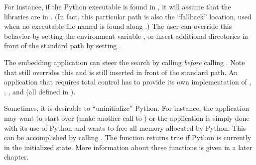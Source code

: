 For instance, if the Python executable is found in
, it will assume that the libraries are in
.  (In fact, this particular path
is also the ``fallback'' location, used when no executable file named
 is found along .)  The user can override
this behavior by setting the environment variable ,
or insert additional directories in front of the standard path by
setting .

The embedding application can steer the search by calling 
 \emph{before} calling 
.  Note that  still
overrides this and  is still inserted in front of
the standard path.  An application that requires total control has to
provide its own implementation of
,
,
, and
 (all
defined in ).

Sometimes, it is desirable to ``uninitialize'' Python.  For instance, 
the application may want to start over (make another call to 
) or the application is simply done with its 
use of Python and wants to free all memory allocated by Python.  This
can be accomplished by calling .  The function
 returns
true if Python is currently in the initialized state.  More
information about these functions is given in a later chapter.
